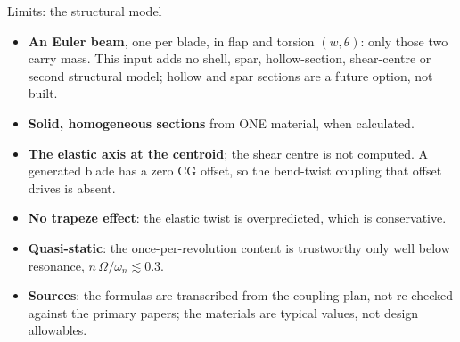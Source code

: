 \begin{frame}{Limits: the structural model}
\begin{itemize}\small
  \item \textbf{An Euler beam}, one per blade, in flap and torsion
        \((w, \theta)\): only those two carry mass. This input adds no shell,
        spar, hollow-section, shear-centre or second structural model; hollow
        and spar sections are a future option, not built.
  \item \textbf{Solid, homogeneous sections} from ONE material, when
        calculated.
  \item \textbf{The elastic axis at the centroid}; the shear centre is not
        computed. A generated blade has a zero CG offset, so the bend-twist
        coupling that offset drives is absent.
  \item \textbf{No trapeze effect}: the elastic twist is overpredicted, which
        is conservative.
  \item \textbf{Quasi-static}: the once-per-revolution content is trustworthy
        only well below resonance, \(n\,\Omega / \omega_n \lesssim 0.3\).
  \item \textbf{Sources}: the formulas are transcribed from the coupling plan,
        not re-checked against the primary papers; the materials are typical
        values, not design allowables.
\end{itemize}
\end{frame}
